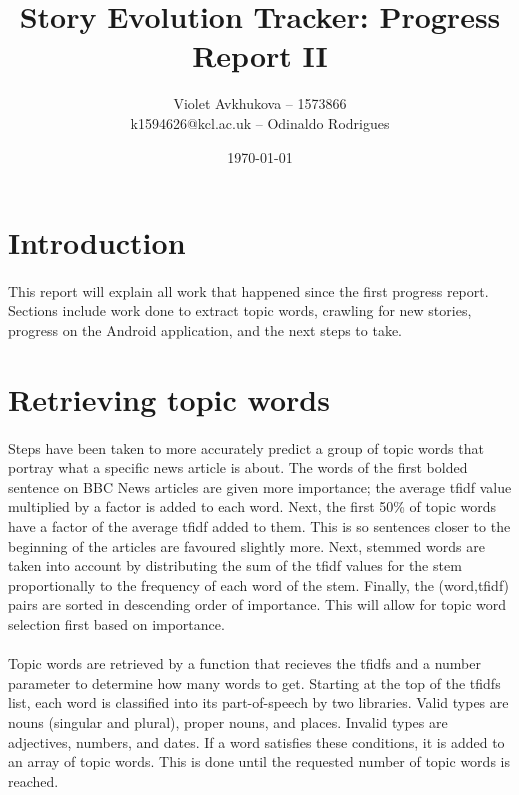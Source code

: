 \documentclass[11pt]{article}
\begin{document}
\title{{\Large Story Evolution Tracker: Progress Report II}}
\author{Violet Avkhukova -- 1573866\\k1594626@kcl.ac.uk -- Odinaldo Rodrigues}
\date{\today}
\maketitle

\setlength{\parskip}{-0.9em}
\lstset{basicstyle=\ttfamily, breaklines=true}

\section{Introduction}
\paragraph{}
This report will explain all work that happened since the first progress report. Sections include work done to extract topic words, crawling for new stories, progress on the Android application, and the next steps to take.

\section{Retrieving topic words}
\paragraph{}
Steps have been taken to more accurately predict a group of topic words that portray what a specific news article is about. The words of the first bolded sentence on BBC News articles are given more importance; the average tfidf value multiplied by a factor is added to each word. Next, the first 50\% of topic words have a factor of the average tfidf added to them. This is so sentences closer to the beginning of the articles are favoured slightly more. Next, stemmed words are taken into account by distributing the sum of the tfidf values for the stem proportionally to the frequency of each word of the stem. Finally, the (word,tfidf) pairs are sorted in descending order of importance. This will allow for topic word selection first based on importance.
\paragraph{}
Topic words are retrieved by a function that recieves the tfidfs and a number parameter to determine how many words to get. Starting at the top of the tfidfs list, each word is classified into its part-of-speech by two libraries.  Valid types are nouns (singular and plural), proper nouns, and places. Invalid types are adjectives, numbers, and dates. If a word satisfies these conditions, it is added to an array of topic words. This is done until the requested number of topic words is reached. 
\end{document}

